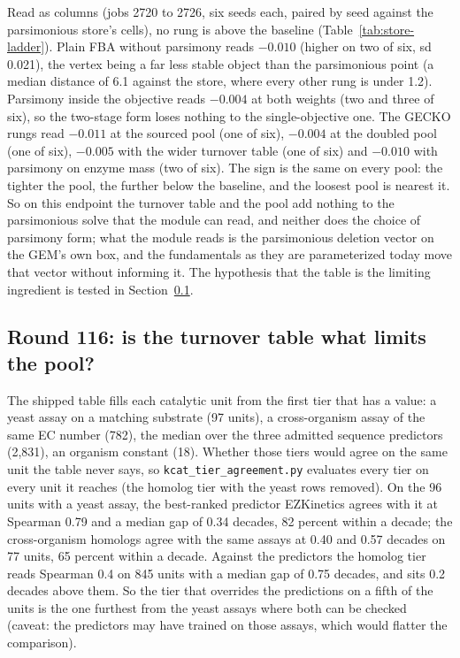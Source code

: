 Read as columns (jobs 2720 to 2726, six seeds each, paired by seed against the
parsimonious store's cells), no rung is above the baseline (Table~\ref{tab:store-ladder}).
Plain FBA without parsimony reads $-0.010$ (higher on two of six, sd 0.021), the vertex
being a far less stable object than the parsimonious point (a median distance of 6.1
against the store, where every other rung is under 1.2). Parsimony inside the
objective reads $-0.004$ at both weights (two and three of six), so the two-stage form
loses nothing to the single-objective one. The GECKO rungs read $-0.011$ at the sourced
pool (one of six), $-0.004$ at the doubled pool (one of six), $-0.005$ with the wider
turnover table (one of six) and $-0.010$ with parsimony on enzyme mass (two of six). The
sign is the same on every pool: the tighter the pool, the further below the baseline,
and the loosest pool is nearest it. So on this endpoint the turnover table and the pool
add nothing to the parsimonious solve that the module can read, and neither does the
choice of parsimony form; what the module reads is the parsimonious deletion vector on
the GEM's own box, and the fundamentals as they are parameterized today move that
vector without informing it. The hypothesis that the table is the limiting ingredient is
tested in Section~\ref{sec:round116}.



\subsection{Round 116: is the turnover table what limits the pool?}
\label{sec:round116}

The shipped table fills each catalytic unit from the first tier that has a value: a
yeast assay on a matching substrate (97 units), a cross-organism assay of the same EC
number (782), the median over the three admitted sequence predictors (2,831), an
organism constant (18). Whether those tiers would agree on the same unit the table never
says, so \texttt{kcat\_tier\_agreement.py} evaluates every tier on every unit it reaches
(the homolog tier with the yeast rows removed). On the 96 units with a yeast assay, the
best-ranked predictor EZKinetics agrees with it at Spearman 0.79 and a median gap of
0.34 decades, 82 percent within a decade; the cross-organism homologs agree with the same
assays at 0.40 and 0.57 decades on 77 units, 65 percent within a decade. Against the
predictors the homolog tier reads Spearman 0.4 on 845 units with a median gap of 0.75
decades, and sits 0.2 decades above them. So the tier that overrides the predictions on a
fifth of the units is the one furthest from the yeast assays where both can be checked
(caveat: the predictors may have trained on those assays, which would flatter the
comparison).

